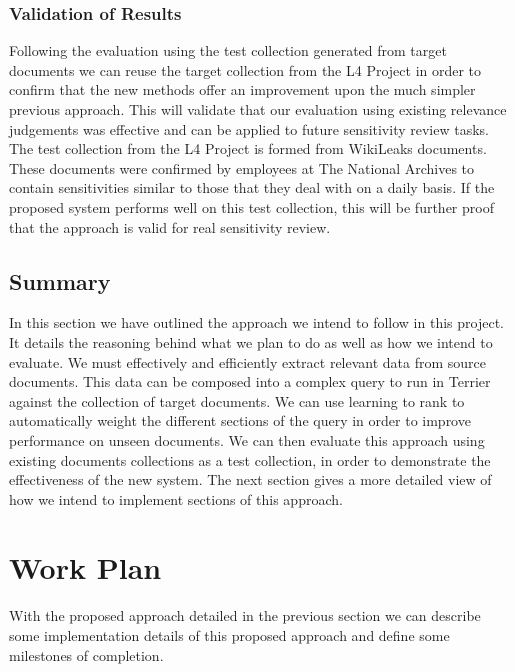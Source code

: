 \documentclass{mprop}
\begin{document}
\subsubsection{Validation of Results}
Following the evaluation using the test collection generated from target documents we can reuse the target collection from the L4 Project in order to confirm that the new methods offer an improvement upon the much simpler previous approach.
This will validate that our evaluation using existing relevance judgements was effective and can be applied to future sensitivity review tasks.
The test collection from the L4 Project is formed from WikiLeaks documents.
These documents were confirmed by employees at The National Archives to contain sensitivities similar to those that they deal with on a daily basis.
If the proposed system performs well on this test collection, this will be further proof that the approach is valid for real sensitivity review.

\subsection{Summary}
In this section we have outlined the approach we intend to follow in this project. It details the reasoning behind what we plan to do as well as how we intend to evaluate.
We must effectively and efficiently extract relevant data from source documents. 
This data can be composed into a complex query to run in Terrier against the collection of target documents. 
We can use learning to rank to automatically weight the different sections of the query in order to improve performance on unseen documents.
We can then evaluate this approach using existing documents collections as a test collection, in order to demonstrate the effectiveness of the new system.
The next section gives a more detailed view of how we intend to implement sections of this approach. 

\section{Work Plan} \label{work_plan}
With the proposed approach detailed in the previous section we can describe some implementation details of this proposed approach and define some milestones of completion.

\end{document}
